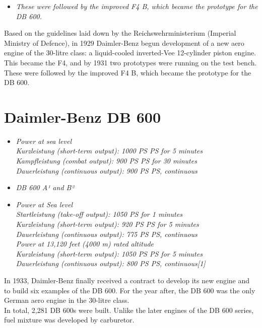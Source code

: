 \begin{itemize}
\item
  \emph{These were followed by the improved F4 B, which became the
  prototype for the DB 600.}
\end{itemize}

Based on the guidelines laid down by the Reichswehrministerium (Imperial
Ministry of Defence), in 1929 Daimler-Benz begun development of a new
aero engine of the 30-litre class: a liquid-cooled inverted-Vee
12-cylinder piston engine. This became the F4, and by 1931 two
prototypes were running on the test bench. These were followed by the
improved F4 B, which became the prototype for the DB 600.

\section{Daimler-Benz DB 600}\label{daimler-benz-db-600}

\begin{itemize}
\item
  \emph{Power at sea level\\
  Kurzleistung (short-term output): 1000 PS PS for 5 minutes\\
  Kampfleistung (combat output): 900 PS PS for 30 minutes\\
  Dauerleistung (continuous output): 900 PS PS, continuous}
\item
  \emph{DB 600 A¹ and B²}
\item
  \emph{Power at Sea level\\
  Startleistung (take-off output): 1050 PS for 1 minutes\\
  Kurzleistung (short-term output): 920 PS PS for 5 minutes\\
  Dauerleistung (continuous output): 775 PS PS, continuous\\
  Power at 13,120 feet (4000 m) rated altitude\\
  Kurzleistung (short-term output): 1050 PS PS for 5 minutes\\
  Dauerleistung (continuous output): 800 PS PS, continuous{[}1{]}}
\end{itemize}

In 1933, Daimler-Benz finally received a contract to develop its new
engine and to build six examples of the DB 600. For the year after, the
DB 600 was the only German aero engine in the 30-litre class.\\
In total, 2,281 DB 600s were built. Unlike the later engines of the DB
600 series, fuel mixture was developed by carburetor.

